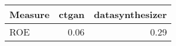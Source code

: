 \begin{tabular}{lrr}
  \toprule
Measure & ctgan & datasynthesizer \\ 
  \midrule
ROE & 0.06 & 0.29 \\ 
   \bottomrule
\end{tabular}
